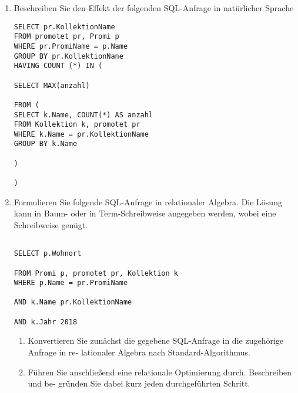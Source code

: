 \documentclass{lehramt-informatik-aufgabe}
\begin{document}
\begin{enumerate}

\item Beschreiben Sie den Effekt der folgenden SQL-Anfrage in
natürlicher Sprache

\begin{verbatim}
SELECT pr.KollektionName
FROM promotet pr, Promi p
WHERE pr.PromiName = p.Name
GROUP BY pr.KollektionNane
HAVING COUNT (*) IN (

SELECT MAX(anzahl)

FROM (
SELECT k.Name, COUNT(*) AS anzahl
FROM Kollektion k, promotet pr
WHERE k.Name = pr.KollektionName
GROUP BY k.Name

)

)
\end{verbatim}


\item Formulieren Sie folgende SQL-Anfrage in relationaler Algebra. Die
Lösung kann in Baum- oder in Term-Schreibweise angegeben werden, wobei
eine Schreibweise genügt.

\begin{verbatim}

SELECT p.Wohnort

FROM Promi p, promotet pr, Kollektion k
WHERE p.Name = pr.PromiName

AND k.Name pr.KollektionName

AND k.Jahr 2018
\end{verbatim}

\begin{enumerate}


\item Konvertieren Sie zunächst die gegebene SQL-Anfrage in die
zugehörige Anfrage in re- lationaler Algebra nach Standard-Algorithmus.


\item Führen Sie anschließend eine relationale Optimierung durch.
Beschreiben und be- gründen Sie dabei kurz jeden durchgeführten Schritt.

\end{enumerate}
\end{enumerate}
\end{document}
